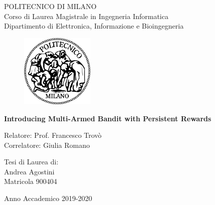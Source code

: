 \thispagestyle{empty}
\vspace*{-1.5cm} \bfseries{
\begin{center}
  \large
  POLITECNICO DI MILANO\\
  \normalsize
  Corso di Laurea Magistrale in Ingegneria 
  Informatica\\
  Dipartimento di Elettronica, Informazione e Bioingegneria\\
  \begin{figure}[htbp]
    \begin{center}
      \includegraphics[width=3.5cm]{./images/logopm}
    \end{center}
  \end{figure}
  \vspace*{0.3cm} \LARGE



  \textbf{Introducing Multi-Armed Bandit with Persistent Rewards}


  \vspace*{.75truecm} \large

\end{center}
\vspace*{3.0cm} \large
\begin{flushleft}


  Relatore: Prof. Francesco Trovò  \\
  Correlatore: Giulia Romano\\

\end{flushleft}
\vspace*{1.0cm}
\begin{flushright}


  Tesi di Laurea di:\\ Andrea Agostini\\ Matricola 900404 \\


\end{flushright}
\vspace*{0.5cm}
\begin{center}



  Anno Accademico 2019-2020
\end{center} \clearpage
}
